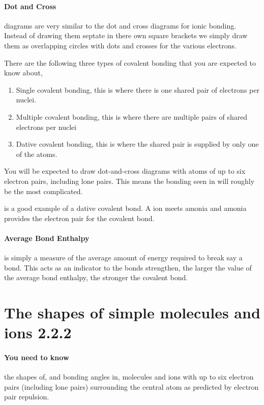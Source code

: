 	\paragraph{Dot and Cross} diagrams are very similar to the dot and cross diagrams for ionic bonding. Instead of drawing them septate in there own square brackets we simply draw them as overlapping circles with dots and crosses for the various electrons.
	
	There are the following three types of covalent bonding that you are expected to know about,
	\begin{enumerate}
		\item Single covalent bonding, this is where there is one shared pair of electrons per nuclei.
		\item Multiple covalent bonding, this is where there are multiple pairs of shared electrons per nuclei
		\item Dative covalent bonding, this is where the shared pair is supplied by only one of the atoms.
	\end{enumerate}
	You will be expected to draw dot-and-cross diagrams with atoms of up to six electron pairs, including lone pairs. This means the bonding seen in  will roughly be the most complicated.
	
	 is a good example of a dative covalent bond. A  ion meets amonia and amonia provides the electron pair for the covalent bond.
	
	\paragraph{Average Bond Enthalpy} is simply a measure of the average amount of energy required to break say a  bond. This acts as an indicator to the bonds strengthen, the larger the value of the average bond enthalpy, the stronger the covalent bond.
	
\section{The shapes of simple molecules and ions 2.2.2}
	
	\paragraph{You need to know} the shapes of, and bonding angles in, molecules and ions with up to six electron pairs (including lone pairs) surrounding the central atom as predicted by electron pair repulsion.
	
